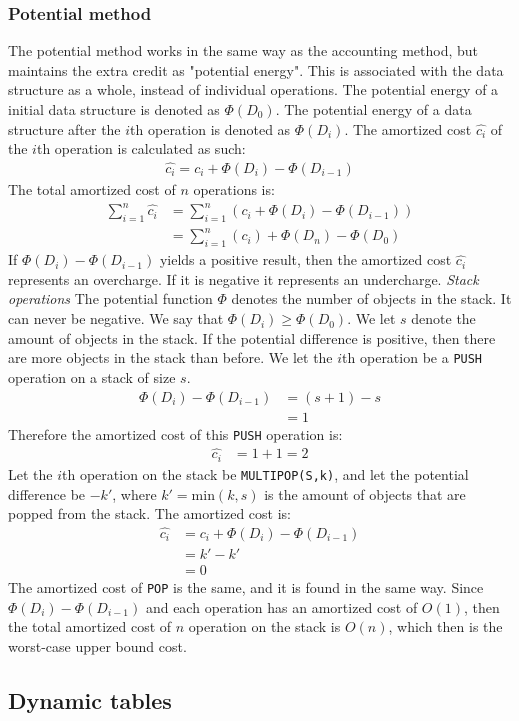 \subsubsection*{Potential method}
The potential method works in the same way as the accounting method, but
maintains the extra credit as "potential energy". This is associated with the
data structure as a whole, instead of individual operations. The potential
energy of a initial data structure is denoted as $\Phi(D_0)$. The potential
energy of a data structure after the $i$th operation is denoted as $\Phi(D_i)$.
The amortized cost $\hat{c_i}$ of the $i$th operation is calculated as such:
\begin{align*}
  \hat{c_i}=c_i+\Phi(D_i)-\Phi(D_{i-1})
\end{align*}
The total amortized cost of $n$ operations is:
\begin{align*}
  \sum^n_{i=1}\hat{c_i}&=\sum^n_{i=1}(c_i+\Phi(D_i)-\Phi(D_{i-1}))\\
  &=\sum^n_{i=1}(c_i)+\Phi(D_n)-\Phi(D_{0})
\end{align*}
If $\Phi(D_i)-\Phi(D_{i-1})$ yields a positive result, then the amortized cost
$\hat{c_i}$ represents an overcharge. If it is negative it represents an
undercharge.
\newline\newline\textit{Stack operations}\newline
The potential function $\Phi$ denotes the number of objects in the stack. It
can never be negative. \newline\newline
We say that $\Phi(D_i)\geq\Phi(D_0)$. We let $s$ denote the amount of objects
in the stack. If the potential difference is positive, then there are more
objects in the stack than before. \newline\newline
We let the $i$th operation be a \texttt{PUSH} operation on a stack of size $s$.
\begin{align*}
  \Phi(D_i)-\Phi(D_{i-1})&=(s+1)-s\\
  &=1
\end{align*}
Therefore the amortized cost of this \texttt{PUSH} operation is:
\begin{align*}
  \hat{c_i}&=1+1=2
\end{align*}
Let the $i$th operation on the stack be \texttt{MULTIPOP(S,k)}, and let the
potential difference be $-k'$, where $k'=\textrm{min}(k,s)$ is the amount of
objects that are popped from the stack. The amortized cost is:
\begin{align*}
  \hat{c_i}&=c_i+\Phi(D_i)-\Phi(D_{i-1})\\
  &=k'-k'\\
  &=0
\end{align*}
The amortized cost of \texttt{POP} is the same, and it is found in the same way.
\newline\newline
Since $\Phi(D_i)-\Phi(D_{i-1})$ and each operation has an amortized cost of
$O(1)$, then the total amortized cost of $n$ operation on the stack is $O(n)$,
which then is the worst-case upper bound cost.

\subsection*{Dynamic tables}
